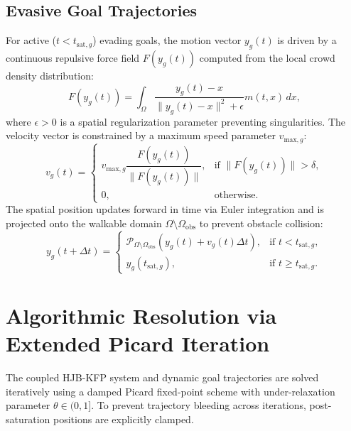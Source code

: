 \documentclass[11pt,a4paper]{article}
\begin{document}
\subsection{Evasive Goal Trajectories}
For active ($t < t_{\text{sat}, g}$) evading goals, the motion vector $y_g(t)$ is driven by a continuous repulsive force field $F(y_g(t))$ computed from the local crowd density distribution:
\begin{equation}
\label{eq:repulsion_force}
F(y_g(t)) = \int_{\Omega} \frac{y_g(t) - x}{\|y_g(t) - x\|^2 + \epsilon} m(t, x) \, dx,
\end{equation}
where $\epsilon > 0$ is a spatial regularization parameter preventing singularities. The velocity vector is constrained by a maximum speed parameter $v_{\text{max}, g}$:
\begin{equation}
v_g(t) = \begin{cases} 
v_{\text{max}, g} \dfrac{F(y_g(t))}{\|F(y_g(t))\|}, & \text{if } \|F(y_g(t))\| > \delta, \\[8pt]
0, & \text{otherwise.}
\end{cases}
\end{equation}
The spatial position updates forward in time via Euler integration and is projected onto the walkable domain $\Omega \setminus \Omega_{\text{obs}}$ to prevent obstacle collision:
\begin{equation}
y_g(t + \Delta t) = \begin{cases} 
\mathcal{P}_{\Omega \setminus \Omega_{\text{obs}}} \left( y_g(t) + v_g(t) \Delta t \right), & \text{if } t < t_{\text{sat}, g}, \\[6pt]
y_g(t_{\text{sat}, g}), & \text{if } t \ge t_{\text{sat}, g}.
\end{cases}
\end{equation}

\section{Algorithmic Resolution via Extended Picard Iteration}

The coupled HJB-KFP system and dynamic goal trajectories are solved iteratively using a damped Picard fixed-point scheme with under-relaxation parameter $\theta \in (0, 1]$. To prevent trajectory bleeding across iterations, post-saturation positions are explicitly clamped.
\end{document}
